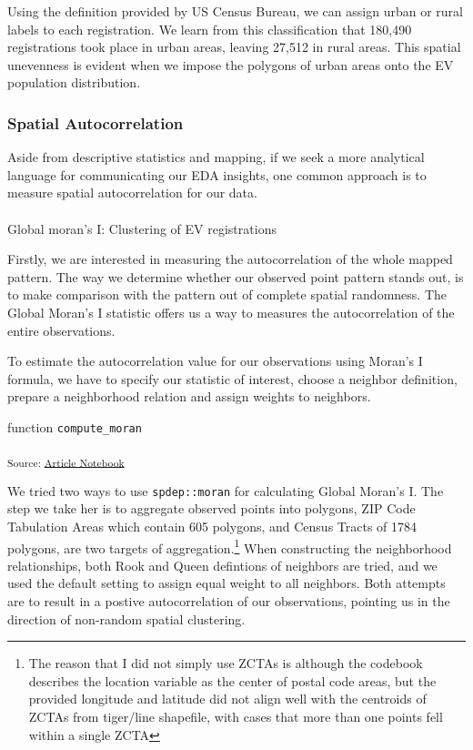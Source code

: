 \documentclass[
  letterpaper,
  DIV=11,
  numbers=noendperiod]{scrartcl}
\makeatletter
\let\oldparagraph\paragraph
\renewcommand{\paragraph}{
    \@ifstar
      \xxxParagraphStar
      \xxxParagraphNoStar
  }
\newcommand{\xxxParagraphStar}[1]{\oldparagraph*{#1}\mbox{}}
\newcommand{\xxxParagraphNoStar}[1]{\oldparagraph{#1}\mbox{}}
\newcommand*\pandocbounded[1]{%
  \sbox\pandoc@box{#1}%
  \Gscale@div\@tempa{\textheight}{\dimexpr\ht\pandoc@box+\dp\pandoc@box\relax}%
  \Gscale@div\@tempb{\linewidth}{\wd\pandoc@box}%
  \ifdim\@tempb\p@<\@tempa\p@\let\@tempa\@tempb\fi%
  \ifdim\@tempa\p@<\p@\scalebox{\@tempa}{\usebox\pandoc@box}%
  \else\usebox{\pandoc@box}%
  \fi%
}
\makeatother
\begin{document}
\pandocbounded{\texttt{[image: image/manu-urb-ev.png]}}

Using the definition provided by US Census Bureau, we can assign urban
or rural labels to each registration. We learn from this classification
that 180,490 registrations took place in urban areas, leaving 27,512 in
rural areas. This spatial unevenness is evident when we impose the
polygons of urban areas onto the EV population distribution.

\subsubsection{Spatial Autocorrelation}\label{spatial-autocorrelation}

Aside from descriptive statistics and mapping, if we seek a more
analytical language for communicating our EDA insights, one common
approach is to measure spatial autocorrelation for our data.

\paragraph{Global moran's I: Clustering of EV
registrations}\label{global-morans-i-clustering-of-ev-registrations}

Firstly, we are interested in measuring the autocorrelation of the whole
mapped pattern. The way we determine whether our observed point pattern
stands out, is to make comparison with the pattern out of complete
spatial randomness. The Global Moran's I statistic offers us a way to
measures the autocorrelation of the entire observations.

To estimate the autocorrelation value for our observations using Moran's
I formula, we have to specify our statistic of interest, choose a
neighbor definition, prepare a neighborhood relation and assign weights
to neighbors.

function \texttt{compute\_moran}

\textsubscript{Source:
\href{https://h-christy.github.io/24-manuscript/index.qmd.html}{Article
Notebook}}

We tried two ways to use \texttt{spdep::moran} for calculating Global
Moran's I. The step we take her is to aggregate observed points into
polygons, ZIP Code Tabulation Areas which contain 605 polygons, and
Census Tracts of 1784 polygons, are two targets of
aggregation.\footnote{The reason that I did not simply use ZCTAs is
  although the codebook describes the location variable as the center of
  postal code areas, but the provided longitude and latitude did not
  align well with the centroids of ZCTAs from tiger/line shapefile, with
  cases that more than one points fell within a single ZCTA} When
constructing the neighborhood relationships, both Rook and Queen
defintions of neighbors are tried, and we used the default setting to
assign equal weight to all neighbors. Both attempts are to result in a
postive autocorrelation of our observations, pointing us in the
direction of non-random spatial clustering.
\end{document}
